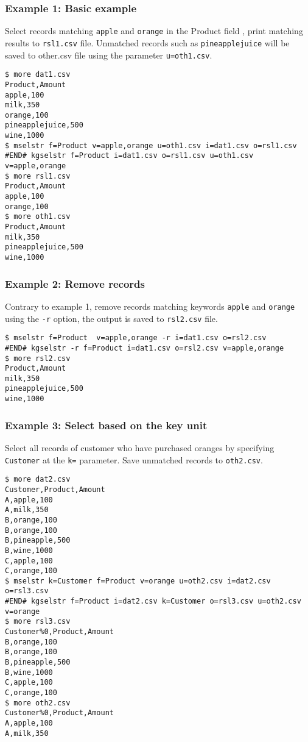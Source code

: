 \subsubsection*{Example 1: Basic example}

Select records matching \verb|apple| and \verb|orange| in the Product field , print matching results to \verb|rsl1.csv| file. Unmatched records such as \verb|pineapplejuice| will be saved to other.csv file using the parameter \verb|u=oth1.csv|.


\begin{Verbatim}[baselinestretch=0.7,frame=single]
$ more dat1.csv
Product,Amount
apple,100
milk,350
orange,100
pineapplejuice,500
wine,1000
$ mselstr f=Product v=apple,orange u=oth1.csv i=dat1.csv o=rsl1.csv
#END# kgselstr f=Product i=dat1.csv o=rsl1.csv u=oth1.csv v=apple,orange
$ more rsl1.csv
Product,Amount
apple,100
orange,100
$ more oth1.csv
Product,Amount
milk,350
pineapplejuice,500
wine,1000
\end{Verbatim}
\subsubsection*{Example 2: Remove records}

Contrary to example 1, remove records matching keywords \verb|apple| and \verb|orange| using the \verb|-r| option, the output is saved to \verb|rsl2.csv| file.


\begin{Verbatim}[baselinestretch=0.7,frame=single]
$ mselstr f=Product  v=apple,orange -r i=dat1.csv o=rsl2.csv
#END# kgselstr -r f=Product i=dat1.csv o=rsl2.csv v=apple,orange
$ more rsl2.csv
Product,Amount
milk,350
pineapplejuice,500
wine,1000
\end{Verbatim}
\subsubsection*{Example 3: Select based on the key unit}

Select all records of customer who have purchased oranges by specifying \verb|Customer| at the \verb|k=| parameter. Save unmatched records to \verb|oth2.csv|.


\begin{Verbatim}[baselinestretch=0.7,frame=single]
$ more dat2.csv
Customer,Product,Amount
A,apple,100
A,milk,350
B,orange,100
B,orange,100
B,pineapple,500
B,wine,1000
C,apple,100
C,orange,100
$ mselstr k=Customer f=Product v=orange u=oth2.csv i=dat2.csv o=rsl3.csv
#END# kgselstr f=Product i=dat2.csv k=Customer o=rsl3.csv u=oth2.csv v=orange
$ more rsl3.csv
Customer%0,Product,Amount
B,orange,100
B,orange,100
B,pineapple,500
B,wine,1000
C,apple,100
C,orange,100
$ more oth2.csv
Customer%0,Product,Amount
A,apple,100
A,milk,350
\end{Verbatim}
